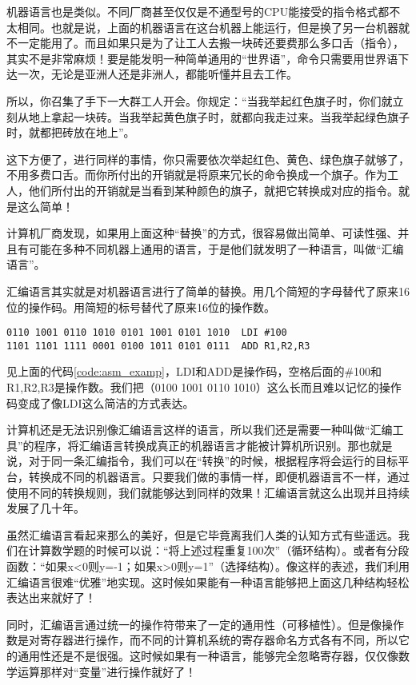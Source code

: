 机器语言也是类似。不同厂商甚至仅仅是不通型号的CPU能接受的指令格式都不太相同。也就是说，上面的机器语言在这台机器上能运行，但是换了另一台机器就不一定能用了。而且如果只是为了让工人去搬一块砖还要费那么多口舌（指令），其实不是非常麻烦！要是能发明一种简单通用的“世界语”，命令只需要用世界语下达一次，无论是亚洲人还是非洲人，都能听懂并且去工作。

所以，你召集了手下一大群工人开会。你规定：“当我举起红色旗子时，你们就立刻从地上拿起一块砖。当我举起黄色旗子时，就都向我走过来。当我举起绿色旗子时，就都把砖放在地上”。

这下方便了，进行同样的事情，你只需要依次举起红色、黄色、绿色旗子就够了，不用多费口舌。而你所付出的开销就是将原来冗长的命令换成一个旗子。作为工人，他们所付出的开销就是当看到某种颜色的旗子，就把它转换成对应的指令。就是这么简单！

计算机厂商发现，如果用上面这种“替换”的方式，很容易做出简单、可读性强、并且有可能在多种不同机器上通用的语言，于是他们就发明了一种语言，叫做“汇编语言”。

汇编语言其实就是对机器语言进行了简单的替换。用几个简短的字母替代了原来16位的操作码。用简短的标号替代了原来16位的操作数。

\begin{lstlisting}[caption=汇编语言,label=code:asm_examp]
0110 1001 0110 1010 0101 1001 0101 1010  LDI #100
1101 1101 1111 0001 0100 1011 0101 0111  ADD R1,R2,R3
\end{lstlisting}

见上面的代码\ref{code:asm_examp}，LDI和ADD是操作码，空格后面的\#100和R1,R2,R3是操作数。我们把（0100 1001 0110 1010）这么长而且难以记忆的操作码变成了像LDI这么简洁的方式表达。

计算机还是无法识别像汇编语言这样的语言，所以我们还是需要一种叫做“汇编工具”的程序，将汇编语言转换成真正的机器语言才能被计算机所识别。那也就是说，对于同一条汇编指令，我们可以在“转换”的时候，根据程序将会运行的目标平台，转换成不同的机器语言。只要我们做的事情一样，即便机器语言不一样，通过使用不同的转换规则，我们就能够达到同样的效果！汇编语言就这么出现并且持续发展了几十年。

虽然汇编语言看起来那么的美好，但是它毕竟离我们人类的认知方式有些遥远。我们在计算数学题的时候可以说：“将上述过程重复100次”（循环结构）。或者有分段函数：“如果x<0则y=-1；如果x>0则y=1”（选择结构）。像这样的表述，我们利用汇编语言很难“优雅”地实现。这时候如果能有一种语言能够把上面这几种结构轻松表达出来就好了！

同时，汇编语言通过统一的操作符带来了一定的通用性（可移植性）。但是像操作数是对寄存器进行操作，而不同的计算机系统的寄存器命名方式各有不同，所以它的通用性还是不是很强。这时候如果有一种语言，能够完全忽略寄存器，仅仅像数学运算那样对“变量”进行操作就好了！

